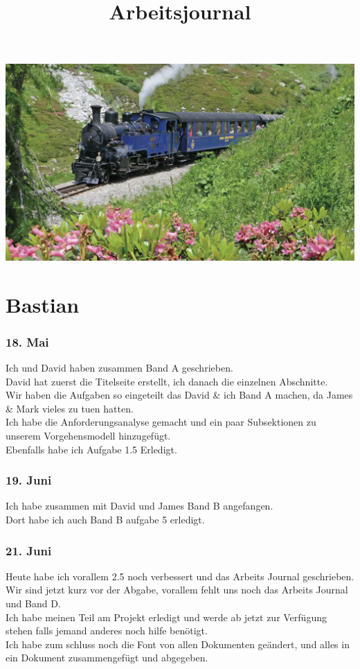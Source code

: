 \documentclass[10pt]{article}
\title{Arbeitsjournal}
\begin{document}
	\maketitle
	\includegraphics[width=17.5cm]{title}
	\pagebreak
	\tableofcontents
	\pagebreak
	\section{Bastian}
			\subsubsection{18. Mai}
			Ich und David haben zusammen Band A geschrieben.\\
			David hat zuerst die Titelseite erstellt, ich danach die einzelnen Abschnitte.\\
			Wir haben die Aufgaben so eingeteilt das David \& ich Band A machen, da James \& Mark vieles zu tuen hatten.\\
			Ich habe die Anforderungsanalyse gemacht und ein paar Subsektionen zu unserem Vorgehensmodell hinzugefügt.\\
			Ebenfalls habe ich Aufgabe 1.5 Erledigt.
			
			\subsubsection{19. Juni}
			Ich habe zusammen mit David und James Band B angefangen.\\
			Dort habe ich auch Band B aufgabe 5 erledigt.
			
			\subsubsection{21. Juni}
			Heute habe ich vorallem 2.5 noch verbessert und das Arbeits Journal geschrieben.\\
			Wir sind jetzt kurz vor der Abgabe, vorallem fehlt uns noch das Arbeits Journal und Band D.\\
			Ich habe meinen Teil am Projekt erledigt und werde ab jetzt zur Verfügung stehen falls jemand anderes noch hilfe benötigt.\\
			Ich habe zum schluss noch die Font von allen Dokumenten geändert, und alles in ein Dokument zusammengefügt und abgegeben.
			
\end{document}
